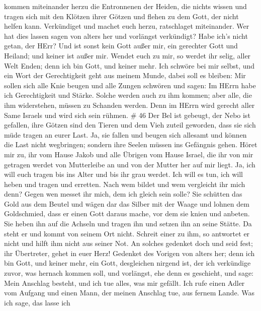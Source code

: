 kommen miteinander herzu die Entronnenen der Heiden, die nichts wissen
und tragen sich mit den Klötzen ihrer Götzen und flehen zu dem Gott, der
nicht helfen kann.  Verkündiget und machet euch herzu,
ratschlaget miteinander. Wer hat dies lassen sagen von alters her und
vorlängst verkündigt? Habe ich's nicht getan, der HErr? Und ist sonst
kein Gott außer mir, ein gerechter Gott und Heiland; und keiner ist
außer mir.  Wendet euch zu mir, so werdet ihr selig, aller
Welt Enden; denn ich bin Gott, und keiner mehr.  Ich
schwöre bei mir selbst, und ein Wort der Gerechtigkeit geht aus meinem
Munde, dabei soll es bleiben: Mir sollen sich alle Knie beugen und alle
Zungen schwören  und sagen: Im HErrn habe ich Gerechtigkeit
und Stärke. Solche werden auch zu ihm kommen; aber alle, die ihm
widerstehen, müssen zu Schanden werden.  Denn im HErrn wird
gerecht aller Same Israels und wird sich sein rühmen. \# 46 
Der Bel ist gebeugt, der Nebo ist gefallen, ihre Götzen sind den Tieren
und dem Vieh zuteil geworden, dass sie sich müde tragen an eurer Last.
 Ja, sie fallen und beugen sich allesamt und können die Last
nicht wegbringen; sondern ihre Seelen müssen ins Gefängnis gehen.
 Höret mir zu, ihr vom Hause Jakob und alle Übrigen vom
Hause Israel, die ihr von mir getragen werdet von Mutterleibe an und von
der Mutter her auf mir liegt.  Ja, ich will euch tragen bis
ins Alter und bis ihr grau werdet. Ich will es tun, ich will heben und
tragen und erretten.  Nach wem bildet und wem vergleicht ihr
mich denn? Gegen wen messet ihr mich, dem ich gleich sein solle?
 Sie schütten das Gold aus dem Beutel und wägen dar das
Silber mit der Waage und lohnen dem Goldschmied, dass er einen Gott
daraus mache, vor dem sie knien und anbeten.  Sie heben ihn
auf die Achseln und tragen ihn und setzen ihn an seine Stätte. Da steht
er und kommt von seinem Ort nicht. Schreit einer zu ihm, so antwortet er
nicht und hilft ihm nicht aus seiner Not.  An solches
gedenket doch und seid fest; ihr Übertreter, gehet in euer Herz!
 Gedenket des Vorigen von alters her; denn ich bin Gott, und
keiner mehr, ein Gott, desgleichen nirgend ist,  der ich
verkündige zuvor, was hernach kommen soll, und vorlängst, ehe denn es
geschieht, und sage: Mein Anschlag besteht, und ich tue alles, was mir
gefällt.  Ich rufe einen Adler vom Aufgang und einen Mann,
der meinen Anschlag tue, aus fernem Lande. Was ich sage, das lasse ich
